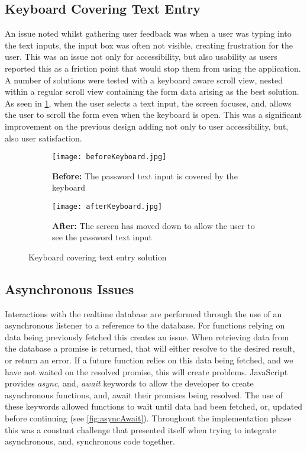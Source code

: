 \subsection*{Keyboard Covering Text Entry}
An issue noted whilst gathering user feedback was when a user was typing into the text inputs, the input box was often not visible, creating frustration for the user. This was an issue not only for accessibility, but also usability as users reported this as a friction point that would stop them from using the application. A number of solutions were tested with a keyboard aware scroll view, nested within a regular scroll view containing the form data arising as the best solution. As seen in \ref{fig:keyboard}, when the user selects a text input, the screen focuses, and, allows the user to scroll the form even when the keyboard is open. This was a significant improvement on the previous design adding not only to user accessibility, but, also user satisfaction.
\begin{figure}[!htbp]
    \centering
    \begin{subfigure}[b]{0.25\textwidth}
        \texttt{[image: beforeKeyboard.jpg]}
        \caption{\textbf{Before:} The password text input is covered by the keyboard}
    \end{subfigure}
    \hspace{1.5em}
    \begin{subfigure}[b]{0.25\textwidth}
        \texttt{[image: afterKeyboard.jpg]}
        \caption{\textbf{After:} The screen has moved down to  allow  the user to see the password text input}
    \end{subfigure}
    \caption{Keyboard covering text entry solution }
    \label{fig:keyboard}
\end{figure}


\subsection*{Asynchronous Issues}
Interactions with the realtime database are performed through the use of an asynchronous listener to a reference to the database. For functions relying on data being previously fetched this creates an issue. When retrieving data from the database a promise is returned, that will either resolve to the desired result, or return an error. If a future function relies on this data being fetched, and we have not waited on the resolved promise, this will create problems. JavaScript provides \textit{async}, and, \textit{await} keywords to allow the developer to create asynchronous functions, and, await their promises being resolved. The use of these keywords allowed functions to wait until data had been fetched, or, updated before continuing (see \ref{fig:asyncAwait}). Throughout the implementation phase this was a constant challenge that presented itself when trying to integrate asynchronous, and, synchronous code together.

